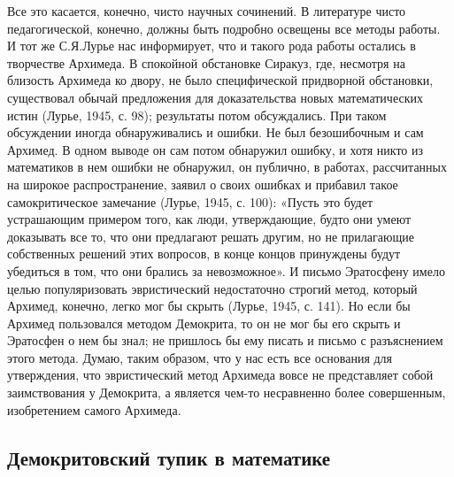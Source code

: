 Все  это  касается, конечно,  чисто  научных  сочинений. В  литературе
чисто  педагогической,  конечно,  должны быть  подробно  освещены  все
методы  работы. И  тот  же  С.Я.Лурье нас  информирует,  что и  такого
рода  работы остались  в творчестве  Архимеда. В  спокойной обстановке
Сиракуз,  где,  несмотря  на  близость  Архимеда  ко  двору,  не  было
специфической  придворной обстановки,  существовал обычай  предложения
для  доказательства  новых  математических   истин  (Лурье,  1945,  с.
98);  результаты  потом  обсуждались.   При  таком  обсуждении  иногда
обнаруживались и  ошибки. Не был  безошибочным и сам Архимед.  В одном
выводе он  сам потом обнаружил ошибку,  и хотя никто из  математиков в
нем  ошибки не  обнаружил,  он публично,  в  работах, рассчитанных  на
широкое  распространение,  заявил о  своих  ошибках  и прибавил  такое
самокритическое  замечание (Лурье,  1945,  с. 100):  «Пусть это  будет
устрашающим  примером того,  как люди,  утверждающие, будто  они умеют
доказывать все то, что они предлагают решать другим, но не прилагающие
собственных  решений этих  вопросов, в  конце концов  принуждены будут
убедиться в том, что они  брались за невозможное». И письмо Эратосфену
имело целью  популяризовать эвристический недостаточно  строгий метод,
который Архимед, конечно,  легко мог бы скрыть (Лурье,  1945, с. 141).
Но если бы Архимед пользовался методом  Демокрита, то он не мог бы его
скрыть и Эратосфен о нем бы знал; не пришлось бы ему писать и письмо с
разъяснением этого  метода. Думаю, таким  образом, что у нас  есть все
основания для  утверждения, что эвристический метод  Архимеда вовсе не
представляет  собой  заимствования  у  Демокрита,  а  является  чем-то
несравненно более совершенным, изобретением самого Архимеда.

\subsection{Демокритовский тупик в математике}

